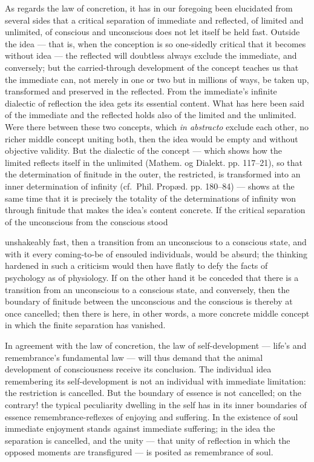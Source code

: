 \documentclass[12pt,a4paper]{book}
\begin{document}
As regards the law of concretion, it has in our foregoing been elucidated from several
sides that a critical separation of immediate and reflected, of limited and unlimited,
of conscious and unconscious does not let itself be held fast. Outside the idea --- that
is, when the conception is so one-sidedly critical that it becomes without idea --- the
reflected will doubtless always exclude the immediate, and conversely; but the
carried-through development of the concept teaches us that the immediate can, not
merely in one or two but in millions of ways, be taken up, transformed and preserved in
the reflected. From the immediate's infinite dialectic of reflection the idea gets its
essential content. What has here been said of the immediate and the reflected holds also
of the limited and the unlimited. Were there between these two concepts, which
\textit{in abstracto} exclude each other, no richer middle concept uniting both, then
the idea would be empty and without objective validity. But the dialectic of the
concept --- which shows how the limited reflects itself in the unlimited (Mathem. og
Dialekt. pp. 117--21), so that the determination of finitude in the outer, the
restricted, is transformed into an inner determination of infinity (cf.\ Phil. Propæd.
pp. 180--84) --- shows at the same time that it is precisely the totality of the
determinations of infinity won through finitude that makes the idea's content concrete.
If the critical separation of the unconscious from the conscious stood

unshakeably fast, then a transition from an unconscious to a conscious state, and with
it every coming-to-be of ensouled individuals, would be absurd; the thinking hardened
in such a criticism would then have flatly to defy the facts of psychology as of
physiology. If on the other hand it be conceded that there is a transition from an
unconscious to a conscious state, and conversely, then the boundary of finitude between
the unconscious and the conscious is thereby at once cancelled; then there is here, in
other words, a more concrete middle concept in which the finite separation has vanished.

In agreement with the law of concretion, the law of self-development --- life's and
remembrance's fundamental law --- will thus demand that the animal development of
consciousness receive its conclusion. The individual idea remembering its
self-development is not an individual with immediate limitation: the restriction is
cancelled. But the boundary of essence is not cancelled; on the contrary! the typical
peculiarity dwelling in the self has in its inner boundaries of essence
remembrance-reflexes of enjoying and suffering. In the existence of soul immediate
enjoyment stands against immediate suffering; in the idea the separation is cancelled,
and the unity --- that unity of reflection in which the opposed moments are transfigured
--- is posited as remembrance of soul.
\end{document}
